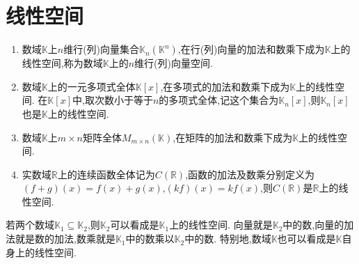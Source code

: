 \documentclass[../../main.tex]{subfiles}%
\begin{document}
\section{线性空间}

\begin{example}[$\,\,$常见的线性空间]\label{example:常见的线性空间}
\begin{enumerate}[(1)]
\item 数域\(\mathbb{K}\)上\(n\)维行(列)向量集合\(\mathbb{K}_n(\mathbb{K}^n)\),在行(列)向量的加法和数乘下成为\(\mathbb{K}\)上的线性空间,称为数域\(\mathbb{K}\)上的\(n\)维行(列)向量空间.
\item 数域\(\mathbb{K}\)上的一元多项式全体\(\mathbb{K}[x]\),在多项式的加法和数乘下成为\(\mathbb{K}\)上的线性空间. 在\(\mathbb{K}[x]\)中,取次数小于等于\(n\)的多项式全体,记这个集合为\(\mathbb{K}_n[x]\),则\(\mathbb{K}_n[x]\)也是\(\mathbb{K}\)上的线性空间.
\item 数域\(\mathbb{K}\)上\(m\times n\)矩阵全体\(M_{m\times n}(\mathbb{K})\),在矩阵的加法和数乘下成为\(\mathbb{K}\)上的线性空间.
\item \label{example:常见的线性空间(4)}实数域\(\mathbb{R}\)上的连续函数全体记为\(C(\mathbb{R})\),函数的加法及数乘分别定义为\((f + g)(x)=f(x)+g(x)\),\((kf)(x)=kf(x)\),则\(C(\mathbb{R})\)是\(\mathbb{R}\)上的线性空间.
\end{enumerate}
\end{example}

\begin{proposition}\label{proposition:数域上的线性空间}
若两个数域\(\mathbb{K}_1\subseteq\mathbb{K}_2\),则\(\mathbb{K}_2\)可以看成是\(\mathbb{K}_1\)上的线性空间. 向量就是\(\mathbb{K}_2\)中的数,向量的加法就是数的加法,数乘就是\(\mathbb{K}_1\)中的数乘以\(\mathbb{K}_2\)中的数. 特别地,数域\(\mathbb{K}\)也可以看成是\(\mathbb{K}\)自身上的线性空间.
\end{proposition}
\end{document}
